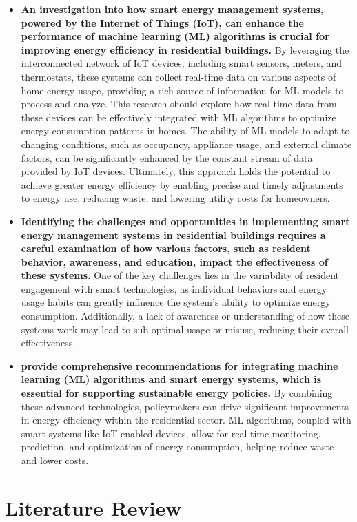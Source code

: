 \documentclass[a4paper, 12pt]{article}
\begin{document}
\begin {itemize}
    \item \textbf{An investigation into how smart energy management systems, powered by the Internet of Things (IoT), can enhance the performance of machine learning (ML) algorithms is crucial for improving energy efficiency in residential buildings.} By leveraging the interconnected network of IoT devices, including smart sensors, meters, and thermostats, these systems can collect real-time data on various aspects of home energy usage, providing a rich source of information for ML models to process and analyze. This research should explore how real-time data from these devices can be effectively integrated with ML algorithms to optimize energy consumption patterns in homes. The ability of ML models to adapt to changing conditions, such as occupancy, appliance usage, and external climate factors, can be significantly enhanced by the constant stream of data provided by IoT devices. Ultimately, this approach holds the potential to achieve greater energy efficiency by enabling precise and timely adjustments to energy use, reducing waste, and lowering utility costs for homeowners.
    \item \textbf{Identifying the challenges and opportunities in implementing smart energy management systems in residential buildings requires a careful examination of how various factors, such as resident behavior, awareness, and education, impact the effectiveness of these systems.} One of the key challenges lies in the variability of resident engagement with smart technologies, as individual behaviors and energy usage habits can greatly influence the system's ability to optimize energy consumption. Additionally, a lack of awareness or understanding of how these systems work may lead to sub-optimal usage or misuse, reducing their overall effectiveness.
    \item \textbf{provide comprehensive recommendations for integrating machine learning (ML) algorithms and smart energy systems, which is essential for supporting sustainable energy policies.} By combining these advanced technologies, policymakers can drive significant improvements in energy efficiency within the residential sector. ML algorithms, coupled with smart systems like IoT-enabled devices, allow for real-time monitoring, prediction, and optimization of energy consumption, helping reduce waste and lower costs.
\end{itemize}

\section{Literature Review}
\end{document}
